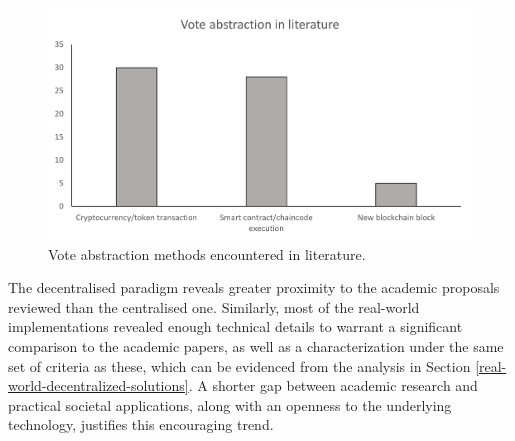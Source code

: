 \documentclass[../access.tex]{subfiles}
\begin{document}
	\begin{figure}[ht!]
        \centering
        \includegraphics[width=\columnwidth]{Images/almei6.png}
        \caption{Vote abstraction methods encountered in literature.}
        \label{fig:vote-abstraction-methods}
    \end{figure}

    The decentralised paradigm reveals greater proximity to the academic proposals reviewed than the centralised one. Similarly, most of the real-world implementations revealed enough technical details to warrant a significant comparison to the academic papers, as well as a characterization under the same set of criteria as these, which can be evidenced from the analysis in Section \ref{real-world-decentralized-solutions}. A shorter gap between academic research and practical societal applications, along with an openness to the underlying technology, justifies this encouraging trend.
    \twocolumn
\end{document}
